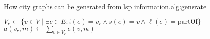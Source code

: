 \begin{talgorithm}{How \gls{city} graphs can be generated from \gls{lsp} information.}{alg:generate}
\begin{algorithm}[H]
\begin{algorithmic}[1]
			\Statex
			\State $V_c \gets \{v \in V \mid \exists e \in E: t(e) = v_r \land s(e) = v \land \ell(e) = \text{partOf}\}$ 
			\State {}
			\EndFor
			 
			\State $a(v_r, m) \gets \sum\limits_{v \in V_c} a(v, m)$
			\EndIf
			\EndFunction
			\label{alg:generate:funcend}
		\end{algorithmic}
	\end{algorithm}
\end{talgorithm}

\tikzexternalenable
